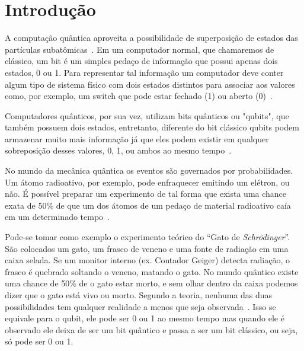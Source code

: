 \documentclass[a4paper, 12pt, oneside]{book}
\begin{document}
\tableofcontents

\thispagestyle{myheadings}


\listoffigures
{}

\thispagestyle{myheadings}





\pagebreak
{}

\chapter{Introdução}
\thispagestyle{empty}

A computação quântica aproveita a possibilidade de superposição de estados das partículas subatômicas~\cite{wiredQC}. Em um computador normal, que chamaremos de clássico, um bit é um simples pedaço de informação que possui apenas dois estados, 0 ou 1. Para representar tal informação um computador deve conter algum tipo de sistema físico com dois estados distintos para associar aos valores como, por exemplo, um switch que pode estar fechado (1) ou aberto (0)~\cite{mermin}.

Computadores quânticos, por sua vez, utilizam bits quânticos ou "qubits", que também possuem dois estados, entretanto, diferente do bit clássico qubits podem armazenar muito mais informação já que eles podem existir em qualquer sobreposição desses valores, 0, 1, ou ambos ao mesmo tempo~\cite{wiredQC}. 

No mundo da mecânica quântica os eventos são governados por probabilidades. Um átomo radioativo, por exemplo, pode enfraquecer emitindo um elétron, ou não. É possível preparar um experimento de tal forma que exista uma chance exata de 50\% de que um dos átomos de um pedaço de material radioativo caía em um determinado tempo~\cite{gribbin}.

Pode-se tomar como exemplo o experimento teórico do ``Gato de \textit{Schrödinger}''. São colocados um gato, um frasco de veneno e uma fonte de radiação em uma caixa selada. Se um monitor interno (ex. Contador Geiger) detecta radiação, o frasco é quebrado soltando o veneno, matando o gato. No mundo quântico existe uma chance de 50\% de o gato estar morto, e sem olhar dentro da caixa podemos dizer que o gato está vivo ou morto. Segundo a teoria, nenhuma das duas possibilidades tem qualquer realidade a menos que seja observada~\cite{gribbin}. Isso se equivale para o qubit, ele pode ser 0 ou 1 ao mesmo tempo mas quando ele é observado ele deixa de ser um bit quântico e passa a ser um bit clássico, ou seja, só pode ser 0 ou 1.
\end{document}
